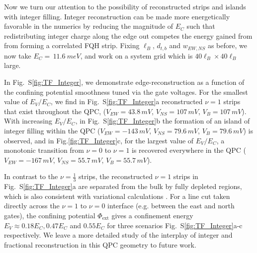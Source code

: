 \documentclass[reprint,prl,aps,superscriptaddress]{revtex4-1}
\begin{document}
Now we turn our attention to the possibility of reconstructed strips and islands with integer filling.  Integer reconstruction can be made more energetically favorable in the numerics by reducing the magnitude of $E_C$ such that redistributing integer charge along the edge out competes the energy gained from from forming a correlated FQH strip. Fixing $\ell_B$, $d_{t,b}$ and $w_{EW, NS}$ as before, we now take $E_C = \,11.6~\si{meV}$, and work on a system grid which is $40\ell_B \times 40 \ell_B$ large.

In Fig.~S\ref{fig:TF_Integer}, we demonstrate edge-reconstruction as a function of the confining potential smoothness tuned via the gate voltages. For the smallest value of $E_V / E_C$, we find in Fig.~S\ref{fig:TF_Integer}a reconstructed $\nu=1$ strips that exist throughout the QPC,
($V_{EW}=43.8\,\si{mV}$, $V_{NS}=107\,\si{mV}$, $V_B=107\,\si{mV}$).  With increasing $E_V / E_C$, in Fig.~S\ref{fig:TF_Integer}b the formation of an island of integer filling within the QPC ($V_{EW} = -143\,\si{mV}$, $V_{NS}=79.6\,\si{mV}$, $V_B=79.6\,\si{mV}$) is observed, and in Fig.\ref{fig:TF_Integer}c, for the largest value of $E_V/E_C$, a monotonic transition from $\nu = 0$ to $\nu = 1$ is recovered everywhere in the QPC ($V_{EW} = -167\,\si{mV}$, $V_{NS}=55.7\,\si{mV}$, $V_B=55.7\,\si{mV}$).

In contrast to the $\nu=\frac13$ strips, the reconstructed $\nu=1$ strips in Fig.~S\ref{fig:TF_Integer}a are separated from the bulk by fully depleted regions, which is also consistent with variational calculations \cite{khanna_fractional_2021}. For a line cut taken directly across the $\nu=1$ to $\nu=0$ interface (e.g. between the east and north gates), the confining potential $\Phi_\textrm{ext}$ gives a confinement energy $E_V \approx 0.18 E_C, 0.47 E_C$ and $0.55 E_C$ for three scenarios Fig.~S\ref{fig:TF_Integer}a-c respectively. We leave a more detailed study of the interplay of integer and fractional reconstruction in this QPC geometry to future work.
\end{document}
